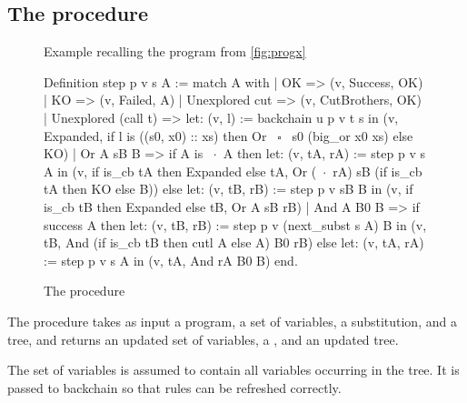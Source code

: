 \subsection{The \step procedure}\label{sec:step}

 \begin{figure}[t]
  \begin{subfigure}{0.32\textwidth} 
     
  \end{subfigure}
  \begin{subfigure}{0.32\textwidth} 
     
  \end{subfigure}
  \begin{subfigure}{0.32\textwidth} 
     
  \end{subfigure}
  \caption{Example recalling the program from \cref{fig:progx}}
  \label{fig:progx'}
\end{figure}

\begin{figure}
  \begin{coqcode}
  Definition step p v s A :=
    match A with
    | OK                  => (v, Success, OK)
    | KO                  => (v, Failed, A)
    | Unexplored cut      => (v, CutBrothers, OK)
    | Unexplored (call t) => 
        let: (v, l) := backchain u p v t s in
        (v, Expanded,
        if l is ((s0, x0) :: xs) then Or ~$\square$~ s0 (big_or x0 xs) else KO)
    | Or A sB B =>
        if A is ~$\cdot$~A then 
          let: (v, tA, rA) := step p v s A in
          (v, if is_cb tA then Expanded else tA, 
           Or (~$\cdot$~rA) sB (if is_cb tA then KO else B))
        else
          let: (v, tB, rB) := step p v sB B in
          (v, if is_cb tB then Expanded else tB, Or A sB rB)
    | And A B0 B =>
        if success A then 
          let: (v, tB, rB) := step p v (next_subst s A) B in
          (v, tB, And (if is_cb tB then cutl A else A) B0 rB)
        else
          let: (v, tA, rA) := step p v s A in (v, tA, And rA B0 B)
    end.
  \end{coqcode}
  \caption{The \step procedure}
\end{figure}

The \step procedure takes as input a program, a set of variables, a
substitution, and a tree, and returns an updated set of variables, a
\steptag, and an updated tree.

The set of variables is assumed to contain all variables occurring in the
tree. It is passed to backchain so that rules can be refreshed correctly.

